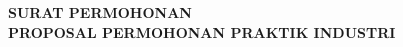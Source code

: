 \newpage
\begin{center}
    \begin{doublespace}
        \textbf{\large \MakeUppercase{SURAT PERMOHONAN \\ PROPOSAL PERMOHONAN PRAKTIK INDUSTRI}}
    \end{doublespace}
\end{center}
